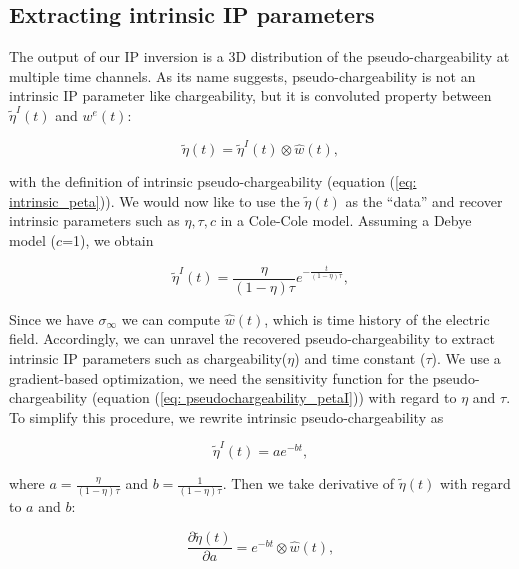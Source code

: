 \documentclass[extra,mreferee]{gji}
\newcommand{\siginf}{\sigma_\infty}
\newcommand{\peta}{\tilde{\eta}}
\begin{document}
\subsection{Extracting intrinsic IP parameters}
\label{section: extract_intrinsicIP}
The output of our IP inversion is a 3D distribution of the pseudo-chargeability at multiple time channels. 
As its name suggests, pseudo-chargeability is not an intrinsic IP parameter like chargeability, but it is convoluted property between $\peta^{I}(t)$ and $w^{e}(t)$:
\begin{linenomath*}
\begin{equation}
  \peta(t) = \peta^{I}(t) \otimes \hat{w}(t),
  \label{eq: pseudochargeability_petaI}
\end{equation}
\end{linenomath*}
with the definition of intrinsic pseudo-chargeability (equation (\ref{eq: intrinsic_peta})).
We would now like to use the $\peta(t)$ as the “data” and recover intrinsic parameters such as $\eta, \tau, c$ in a Cole-Cole model. Assuming a Debye model ($c$=1), we obtain
\begin{linenomath*}
\begin{equation}
    \peta^{I}(t) = \frac{\eta}{(1-\eta)\tau}e^{-\frac{t}{(1-\eta)\tau}},
    \label{eq: intrinsic_peta_debye}
\end{equation}
\end{linenomath*}
Since we have $\siginf$ we can compute $\hat{w}(t)$, which is time history of the electric field. 
Accordingly, we can unravel the recovered pseudo-chargeability to extract intrinsic IP parameters such as chargeability($\eta$) and time constant ($\tau$). 
We use a gradient-based optimization, we need the sensitivity function for the pseudo-chargeability (equation (\ref{eq: pseudochargeability_petaI})) with regard to $\eta$ and $\tau$. 
To simplify this procedure, we rewrite intrinsic pseudo-chargeability as 
\begin{linenomath*}
\begin{equation}
  \peta^{I}(t) = a e^{-bt},
\end{equation}
\end{linenomath*}
where $a = \frac{\eta}{(1-\eta)\tau}$ and $b = \frac{1}{(1-\eta)\tau}$. 
Then we take derivative of $\peta(t)$ with regard to $a$ and $b$:
\begin{linenomath*}
\begin{equation}
  \frac{\partial \peta(t)}{\partial a} = e^{-bt} \otimes \hat{w}(t),
\end{equation}
\end{linenomath*}
\end{document}
